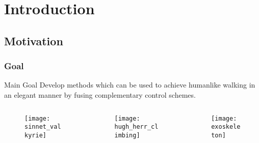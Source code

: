 \section{Introduction}
\showtoc

\subsection{Motivation}

\begin{frame}[t]
  \frametitle{Goal}
  \begin{block}{Main Goal}
    Develop methods which can be used to achieve humanlike walking in an elegant manner by fusing complementary control schemes.
  \end{block}
    \begin{columns}
    \begin{column}{.333\textwidth}
      \begin{figure}
        \centering
        \texttt{[image: sinnet\_valkyrie]}
      \end{figure}
    \end{column}
    \begin{column}{.333\textwidth}
      \begin{figure}
        \centering
        \texttt{[image: hugh\_herr\_climbing]}
      \end{figure}
    \end{column}
    \begin{column}{.333\textwidth}
      \begin{figure}
        \centering
        \texttt{[image: exoskeleton]}
      \end{figure}
    \end{column}
  \end{columns}
\end{frame}

